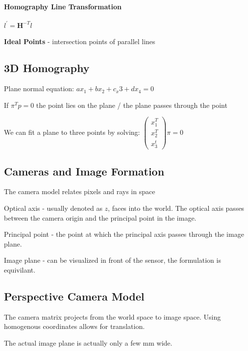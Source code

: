 

\paragraph{Homography Line Transformation}

$l^\prime = \mathbf{H}^{-T} l$

\textbf{Ideal Points} - intersection points of parallel lines

\subsection{3D Homography}

Plane normal equation: $ax_1 + bx_2 + c_x3 + d x_4 = 0$ 

If $\pi^T p = 0$ the point lies on the plane / the plane passes through the point

We can fit a plane to three points by solving:
$\left( \begin{matrix} x_1^T \\ x_2^T \\ x_3^t \end{matrix} \right) \pi = 0 $

\subsection{Cameras and Image Formation}

The camera model relates pixels and rays in space

Optical axis - usually denoted as $z$, faces into the world.
The optical axis passes between the camera origin and the principal point in the image.

Principal point - the point at which the principal axis passes through the image plane.

Image plane - can be visualized in front of the sensor, the formulation is equivilant.


\subsection{Perspective Camera Model}
The camera matrix projects from the world space to image space. Using homogenous coordinates allows for translation.

The actual image plane is actually only a few mm wide.

